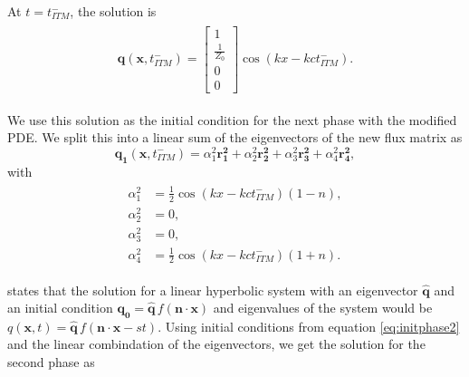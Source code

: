 At $t = t_{ITM}^-$, the solution is 
\begin{align}
    \begin{split}
        \mathbf{q}\left(\mathbf{x}, t_{ITM}^-\right) = \begin{bmatrix}
            1 \\
            \frac{1}{Z_0} \\
            0 \\
            0
            \end{bmatrix} \cos\left(kx - k c t_{ITM}^-\right) .
    \end{split}
    \label{eq:initphase2}
\end{align}

We use this solution as the initial condition for the next phase with the modified \ac{PDE}. We split this into a linear sum of the eigenvectors of the new flux matrix
as 
\begin{equation}
    \mathbf{q_1}\left(\mathbf{x}, t_{ITM}^-\right) = \alpha_1^2 \mathbf{r_1^2} + \alpha_2^2 \mathbf{r_2^2} + \alpha_3^2 \mathbf{r_3^2} + \alpha_4^2 \mathbf{r_4^2},
    \label{eq:linearsum}
\end{equation}
with
\begin{align}
    \begin{split}
        \alpha_1^2 &= \frac{1}{2}\cos\left(kx - k c t_{ITM}^-\right) \left(1 - n\right), \\
        \alpha_2^2 &= 0, \\
        \alpha_3^2 &= 0, \\
        \alpha_4^2 &= \frac{1}{2}\cos\left(kx - k c t_{ITM}^-\right) \left(1 + n\right) .
    \end{split}
\end{align}

\parencite[Sec 18.5]{leveque_2002} states that the solution for a linear hyperbolic system with an eigenvector $\mathbf{\hat{q}}$ and an initial condition $\mathbf{q_0} = \mathbf{\hat{q}} \, f\left(\mathbf{n} \cdot \mathbf{x}\right)$
and eigenvalues of the system would be $q\left(\mathbf{x}, t\right) = \mathbf{\hat{q}} \, f\left( \mathbf{n} \cdot \mathbf{x} - s t\right)$. 
Using initial conditions from equation \ref{eq:initphase2} and the linear combindation of the eigenvectors, we get the solution for the second phase as

